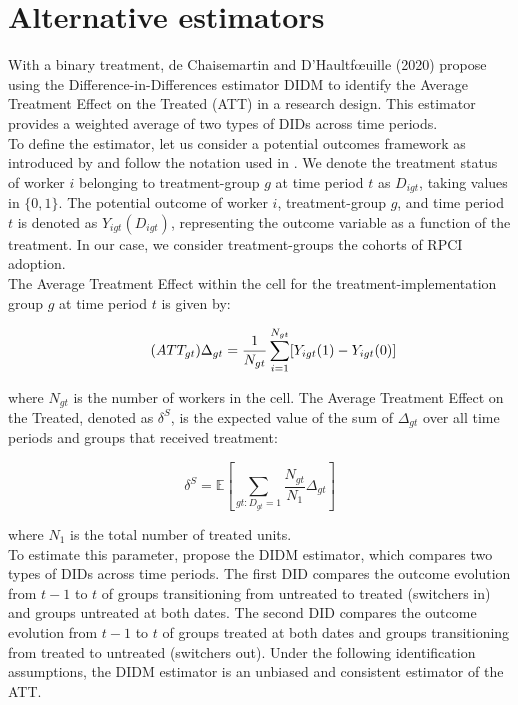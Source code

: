 \documentclass[10pt, oneside]{book}
\begin{document}
\section{Alternative estimators}

With a binary treatment, de Chaisemartin and D'Haultfœuille (2020) propose using the Difference-in-Differences estimator DIDM to identify the Average Treatment Effect on the Treated (ATT) in a research design. This estimator provides a weighted average of two types of DIDs across time periods. \\

To define the estimator, let us consider a potential outcomes framework as introduced by \cite{rubin1974estimating} and follow the notation used in \cite{de2020two}. We denote the treatment status of worker $i$ belonging to treatment-group $g$ at time period $t$ as $D_{igt}$, taking values in $\{0,1\}$. The potential outcome of worker $i$, treatment-group $g$, and time period $t$ is denoted as $Y_{igt}(D_{igt})$, representing the outcome variable as a function of the treatment. In our case, we consider treatment-groups the cohorts of RPCI adoption. \\

The Average Treatment Effect within the cell for the treatment-implementation group $g$ at time period $t$ is given by:

\begin{equation}
    \tag{$ATT_{gt}$}
    \Delta_{gt} = \frac{1}{N_{gt}} \sum_{i=1}^{N_{gt}} [Y_{igt}(1) - Y_{igt}(0)]
\end{equation}

where $N_{gt}$ is the number of workers in the cell. The Average Treatment Effect on the Treated, denoted as $\delta^{S}$, is the expected value of the sum of $\Delta_{gt}$ over all time periods and groups that received treatment:

\begin{equation}
    \tag{$ATT$}
    \delta^{S} = \mathbb{E}\left[\sum_{gt:D_{gt}=1} \frac{N_{gt}}{N_1} \Delta_{gt}\right]
\end{equation}

where $N_1$ is the total number of treated units. \\

To estimate this parameter, \cite{de2020two} propose the DIDM estimator, which compares two types of DIDs across time periods. The first DID compares the outcome evolution from $t-1$ to $t$ of groups transitioning from untreated to treated (switchers in) and groups untreated at both dates. The second DID compares the outcome evolution from $t-1$ to $t$ of groups treated at both dates and groups transitioning from treated to untreated (switchers out). Under the following identification assumptions, the DIDM estimator is an unbiased and consistent estimator of the ATT. \\
\end{document}
